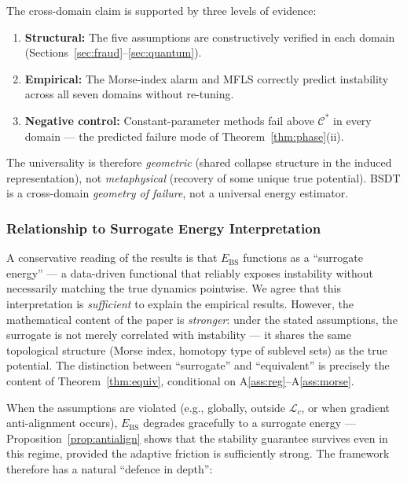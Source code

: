 \documentclass[11pt,a4paper]{article}
\newcommand{\Ebs}{E_{\mathrm{BS}}}
\newcommand{\Cman}{\mathcal{C}^*}
\begin{document}
The cross-domain claim is supported by three levels of evidence:
\begin{enumerate}[nosep]
  \item \textbf{Structural:} The five assumptions are
    constructively verified in each domain
    (Sections~\ref{sec:fraud}--\ref{sec:quantum}).
  \item \textbf{Empirical:} The Morse-index alarm and MFLS
    correctly predict instability across all seven domains
    without re-tuning.
  \item \textbf{Negative control:} Constant-parameter methods
    fail above $\Cman$ in every domain --- the predicted failure
    mode of Theorem~\ref{thm:phase}(ii).
\end{enumerate}

The universality is therefore \emph{geometric} (shared collapse
structure in the induced representation), not \emph{metaphysical}
(recovery of some unique true potential).  BSDT is a
cross-domain \emph{geometry of failure}, not a universal energy
estimator.

\subsubsection{Relationship to Surrogate Energy Interpretation}

A conservative reading of the results is that $\Ebs$ functions as
a ``surrogate energy'' --- a data-driven functional that reliably
exposes instability without necessarily matching the true dynamics
pointwise.  We agree that this interpretation is \emph{sufficient}
to explain the empirical results.  However, the mathematical
content of the paper is \emph{stronger}: under the stated
assumptions, the surrogate is not merely correlated with
instability --- it shares the same topological structure (Morse
index, homotopy type of sublevel sets) as the true potential.
The distinction between ``surrogate'' and ``equivalent'' is
precisely the content of Theorem~\ref{thm:equiv}, conditional on
A\ref{ass:reg}--A\ref{ass:morse}.

When the assumptions are violated (e.g., globally, outside
$\mathcal{L}_c$, or when gradient anti-alignment occurs), $\Ebs$
degrades gracefully to a surrogate energy ---
Proposition~\ref{prop:antialign} shows that the stability
guarantee survives even in this regime, provided the adaptive
friction is sufficiently strong.  The framework therefore has a
natural ``defence in depth'':
\end{document}
